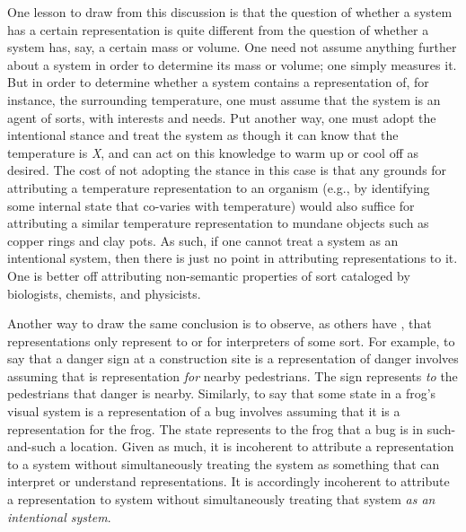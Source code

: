 One lesson to draw from this discussion is that the question of whether a system has a certain representation is quite different from the question of whether a system has, say, a certain mass or volume. One need not assume anything further about a system in order to determine its mass or volume; one simply measures it. But in order to determine whether a system contains a representation of, for instance, the surrounding temperature, one must assume that the system is an agent of sorts, with interests and needs. Put another way, one must adopt the intentional stance and treat the system as though it can know that the temperature is \textit{X}, and can act on this knowledge to warm up or cool off as desired. The cost of not adopting the stance in this case is that any grounds for attributing a temperature representation to an organism (e.g., by identifying some internal state that co-varies with temperature) would also suffice for attributing a similar temperature representation to mundane objects such as copper rings and clay pots. As such, if one cannot treat a system as an intentional system, then there is just no point in attributing representations to it. One is better off attributing non-semantic properties of sort cataloged by biologists, chemists, and physicists.  

Another way to draw the same conclusion is to observe, as others have \citep[e.g.,][]{Brandom:1994}, that representations only represent to or for interpreters of some sort. For example, to say that a danger sign at a construction site is a representation of danger involves assuming that is representation \textit{for} nearby pedestrians. The sign represents \textit{to} the pedestrians that danger is nearby. Similarly, to say that some state in a frog's visual system is a representation of a bug involves assuming that it is a representation for the frog. The state represents to the frog that a bug is in such-and-such a location. Given as much, it is incoherent to attribute a representation to a system without simultaneously treating the system as something that can interpret or understand representations. It is accordingly incoherent to attribute a representation to system without simultaneously treating that system \textit{as an intentional system}. 

